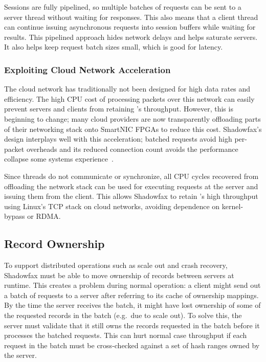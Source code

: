 Sessions are fully pipelined, so multiple batches of requests can be sent to a
server thread without waiting for responses.
%
This also means that a
client thread can continue issuing asynchronous requests into session
buffers while waiting for results.
%
This pipelined approach hides network delays and helps saturate servers.
%
It also helps keep request batch sizes small, which is good for latency.

%
%

\subsubsection{Exploiting Cloud Network Acceleration}

The cloud network has traditionally not been designed for high data
rates and efficiency.
%
The high CPU cost of processing packets over this network can easily
prevent servers and clients from retaining \faster's throughput.
%
However, this is beginning to change; many cloud providers are now
transparently offloading parts of their networking stack onto SmartNIC
FPGAs to reduce this cost.
%
Shadowfax's design interplays well with this acceleration; batched requests
avoid high per-packet overheads and its reduced connection count avoids the
performance collapse some systems experience~\cite{farm-2014}.

Since threads do not communicate or synchronize, all CPU cycles
recovered from offloading the network stack can be used for executing
requests at the server and issuing them from the client.
%
This allows Shadowfax to retain \faster's high throughput using Linux's
TCP stack on cloud networks, avoiding dependence on kernel-bypass
or RDMA.

\subsection{Record Ownership}
\label{sec:ownership}

To support distributed operations such as scale out and crash recovery,
Shadowfax must be able to move ownership of records between servers at
runtime.
%
This creates a problem during normal operation:
%
a client might send out a batch of requests to a server after referring
to its cache of ownership mappings.
%
By the time the server receives the batch, it might have lost ownership of
some of the requested records in the batch (e.g.\ due to scale out).
%
To solve this, the server must validate that it still owns the records requested
in the batch before it processes the batched requests.
%
This can hurt normal case throughput if each request in the
batch must be cross-checked against a set of hash ranges owned by the server.

